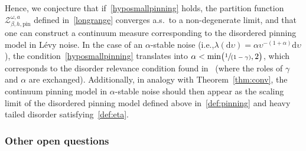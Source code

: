 \documentclass[11pt]{article}
\newcommand{\ie}{i.e.,\xspace}
\numberwithin{equation}{section}
\let\mathcal\mathscr
\newcommand{\spfrac}[2]{\sfrac{#1}{(#2)}}
\theoremstyle{definition}
\newcommand{\dd}{\mathrm{d}}
\newcommand{\cZ}{{\ensuremath{\mathcal Z}} }
\let\ga\alpha
\let\gb\beta
\let\ups\upsilon
\let\go\omega
\begin{document}
Hence, we conjecture that if~\eqref{hyposmallpinning} holds, the partition function~$\cZ_{\gb,h,\mathrm{pin}}^{\go,a}$ defined in~\eqref{longrange} converges a.s.\ to a non-degenerate limit, and that one can construct a continuum measure corresponding to the disordered pinning model in Lévy noise.
In the case of an $\ga$-stable noise (\ie $\lambda(\dd \ups) = \ga \ups^{-(1+\ga)} \dd \ups$),
the condition~\eqref{hyposmallpinning} translates into $\ga < \min \bigl(\spfrac{1}{1-\gamma}, 2 \bigr)$,
which corresponds to the disorder relevance condition found in~\cite{LS17} (where the roles of $\gamma$ and $\alpha$ are exchanged).
Additionally, in analogy with Theorem~\ref{thm:conv}, the continuum pinning model in $\ga$-stable noise should then appear
as the scaling limit of the disordered pinning model defined
above in~\eqref{def:pinning}
and heavy tailed disorder satisfying~\eqref{def:eta}.

\subsubsection{Other open questions}
\end{document}
